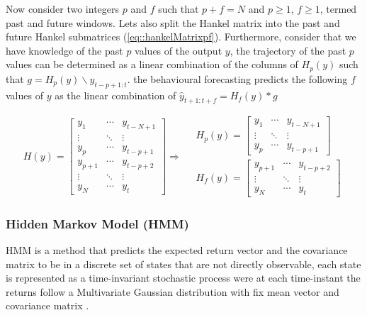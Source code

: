 Now consider two integers $p$ and $f$ such that $p+f=N$ and $p\geq1$, $f\geq1$, termed past and future windows. Lets also split the Hankel matrix into the past and future Hankel submatrices (\ref{eq::hankelMatrixpf}). Furthermore, consider that we have knowledge of the past $p$ values of the output $y$, the trajectory of the past $p$ values can be determined as a linear combination of the columns of $H_p(y)$ such that $g=H_p(y)\backslash  y_{t-p+1:t}$. the behavioural forecasting predicts the following $f$ values of $y$ as the linear combination of $\hat{y}_{t+1:t+f} = H_f(y)*g$ 

\begin{equation}
    \label{eq::hankelMatrixpf}
    H(y)= \begin{bmatrix}
y_1 & \cdots & y_{t-N+1}\\
\vdots & \ddots & \vdots\\
y_p & \cdots & y_{t-p+1} \\
y_{p+1} & \cdots & y_{t-p+2} \\
\vdots & \ddots & \vdots\\
y_N & \cdots & y_t
\end{bmatrix}\Rightarrow{} \quad 
\begin{array}{l}
H_p(y)= \begin{bmatrix}
y_1 & \cdots & y_{t-N+1}\\
\vdots & \ddots & \vdots\\
y_p & \cdots & y_{t-p+1} 
\end{bmatrix}\\
 H_f(y)= \begin{bmatrix}
y_{p+1} & \cdots & y_{t-p+2} \\
\vdots & \ddots & \vdots\\
y_N & \cdots & y_t
\end{bmatrix}
\end{array}
\end{equation}

\subsubsection{Hidden Markov Model (\ac{HMM})}

\ac{HMM} is a method that predicts the expected return vector and the covariance matrix to be in a discrete set of states that are not directly observable, each state is represented as a time-invariant stochastic process were at each time-instant the returns follow a  Multivariate Gaussian distribution with fix mean vector and covariance matrix \cite{MultiPeriod_PO_mpc}.


